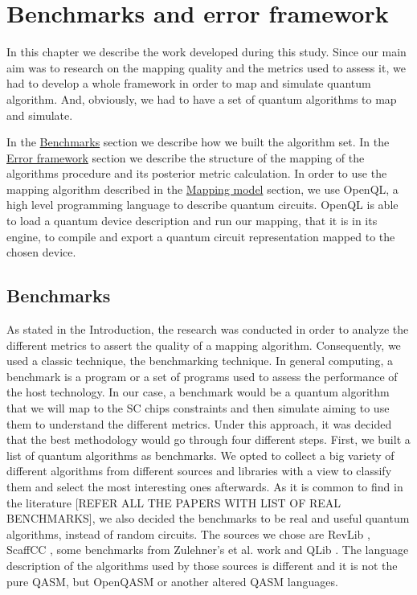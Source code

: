 
\chapter*{Benchmarks and error framework}
\label{sec:org01b0513}

In this chapter we describe the work developed during this study.
Since our main aim was to research on the mapping quality and the metrics used to assess it, we had to develop a whole framework in order to map and simulate quantum algorithm.
And, obviously, we had to have a set of quantum algorithms to map and simulate.

In the \hyperref[sec:org9b5be28]{Benchmarks} section we describe how we built the algorithm set.
In the \hyperref[sec:org1d72d85]{Error framework} section we describe the structure of the mapping of the algorithms procedure and its posterior metric calculation.
In order to use the mapping algorithm described in the \href{chapter-3.org}{Mapping model} section, we use OpenQL, a high level programming language to describe quantum circuits.
OpenQL is able to load a quantum device description and run our mapping, that it is in its engine, to compile and export a quantum circuit representation mapped to the chosen device.

\section*{Benchmarks}
\label{sec:org9b5be28}
As stated in the Introduction, the research was conducted in order to analyze the different metrics to assert the quality of a mapping algorithm.
Consequently, we used a classic technique, the benchmarking technique.
In general computing, a benchmark is a program or a set of programs used to assess the performance of the host technology.
In our case, a benchmark would be a quantum algorithm that we will map to the SC chips constraints and then simulate aiming to use them to understand the different metrics.
Under this approach, it was decided that the best methodology would go through four different steps.
First, we built a list of quantum algorithms as benchmarks.
We opted to collect a big variety of different algorithms from different sources and libraries with a view to classify them and select the most interesting ones afterwards.
As it is common to find in the literature [REFER ALL THE PAPERS WITH LIST OF REAL BENCHMARKS], we also decided the benchmarks to be real and useful quantum algorithms, instead of random circuits.
The sources we chose are RevLib \cite{Wille_2008}, ScaffCC \cite{JavadiAbhari_2015}, some benchmarks from Zulehner's et al. work \cite{zulehner17:effic_method_mappin_quant_circuit} and QLib \cite{Lin_2014}.
The language description of the algorithms used by those sources is different and it is not the pure QASM, but OpenQASM or another altered QASM languages.


